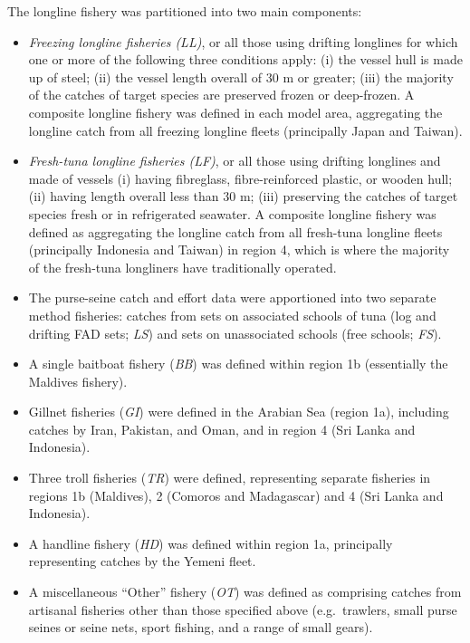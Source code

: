 \documentclass[
]{scrartcl}
\begin{document}
The longline fishery was partitioned into two main components:

\begin{itemize}
\item
  \emph{Freezing longline fisheries (LL)}, or all those using drifting
  longlines for which one or more of the following three conditions
  apply: (i) the vessel hull is made up of steel; (ii) the vessel length
  overall of 30 m or greater; (iii) the majority of the catches of
  target species are preserved frozen or deep-frozen. A composite
  longline fishery was defined in each model area, aggregating the
  longline catch from all freezing longline fleets (principally Japan
  and Taiwan).
\item
  \emph{Fresh-tuna longline fisheries (LF)}, or all those using drifting
  longlines and made of vessels (i) having fibreglass, fibre-reinforced
  plastic, or wooden hull; (ii) having length overall less than 30 m;
  (iii) preserving the catches of target species fresh or in
  refrigerated seawater. A composite longline fishery was defined as
  aggregating the longline catch from all fresh-tuna longline fleets
  (principally Indonesia and Taiwan) in region 4, which is where the
  majority of the fresh-tuna longliners have traditionally operated.
\item
  The purse-seine catch and effort data were apportioned into two
  separate method fisheries: catches from sets on associated schools of
  tuna (log and drifting FAD sets; \emph{LS}) and sets on unassociated
  schools (free schools; \emph{FS}).
\item
  A single baitboat fishery (\emph{BB}) was defined within region 1b
  (essentially the Maldives fishery).
\item
  Gillnet fisheries (\emph{GI}) were defined in the Arabian Sea (region
  1a), including catches by Iran, Pakistan, and Oman, and in region 4
  (Sri Lanka and Indonesia).
\item
  Three troll fisheries (\emph{TR}) were defined, representing separate
  fisheries in regions 1b (Maldives), 2 (Comoros and Madagascar) and 4
  (Sri Lanka and Indonesia).
\item
  A handline fishery (\emph{HD}) was defined within region 1a,
  principally representing catches by the Yemeni fleet.
\item
  A miscellaneous ``Other'' fishery (\emph{OT}) was defined as
  comprising catches from artisanal fisheries other than those specified
  above (e.g.~trawlers, small purse seines or seine nets, sport fishing,
  and a range of small gears).
\end{itemize}
\end{document}
